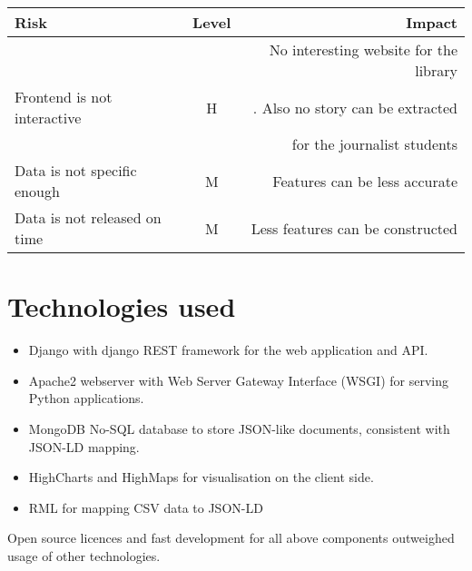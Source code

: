 \begin{center}
  \begin{tabular}{ l | c | r  }
    \hline
    Risk & Level & Impact \\ \hline
   & & No interesting website for the library\\
      Frontend is not interactive & H & . Also no story can be extracted\\
    & &  for the journalist students \\
    Data is not specific enough & M & Features can be less accurate \\
    Data is not released on time & M & Less features can be constructed\\
  \end{tabular}
\end{center}

\section{Technologies used}

\begin{itemize}
	\item Django with django REST framework for the web application and API.
	\item Apache2 webserver with Web Server Gateway Interface (WSGI) for serving Python applications.
	\item MongoDB No-SQL database to store JSON-like documents, consistent with JSON-LD mapping.
  \item HighCharts and HighMaps for visualisation on the client side.
  \item RML for mapping CSV data to JSON-LD
\end{itemize}

Open source licences and fast development for all above components outweighed usage of other technologies.

